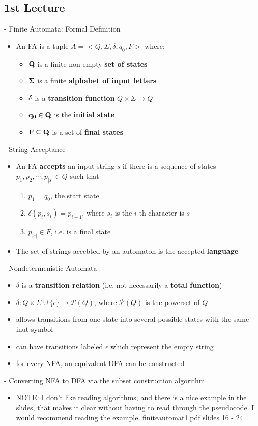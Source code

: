 \documentclass[11pt]{article}
\begin{document}
\subsection{ 1st Lecture }

- Finite Automata: Formal Definition
\begin{itemize}
 \item An FA is a tuple $A=<Q, \Sigma , \delta , q_0 , F>$ where:
  \begin{itemize}
   \item ${\bf Q}$ is a finite non empty {\bf set of states}
   \item ${\bf \Sigma}$ is a finite {\bf alphabet of input letters}
   \item ${\bf \delta}$ is a {\bf transition function} $Q \times \Sigma \rightarrow Q $
   \item ${\bf q_0 \in Q}$ is the {\bf initial state}
   \item ${\bf F \subseteq Q}$ is a set of {\bf final states}
  \end{itemize}
\end{itemize}
- String Acceptance
\begin{itemize}
 \item An FA {\bf accepts} an input string $s$ if there is a sequence of states $p_1 , p_2 , \dotsi , p_{|s|} \in Q$ such that
  \begin{enumerate}
   \item $p_1 = q_0$, the start state
   \item $\delta(p_i , s_i ) = p_{i+1}$, where $s_i$ is the $i$-th character is $s$
   \item $p_{|s|} \in F$, i.e. is a final state
  \end{enumerate}
 \item The set of strings accebted by an automaton is the accepted {\bf language}
\end{itemize}
- Nondetermenistic Automata
\begin{itemize}
 \item $\delta$ is a {\bf transition relation} (i.e. not necessarily a {\bf total function})
 \item $\delta : Q \times \Sigma \cup \{ \epsilon \} \rightarrow \mathcal{P}(Q)$, where $\mathcal{P}(Q)$ is the powerset of $Q$
 \item allows transitions from one state into several possible states with the same inut symbol
 \item can have transitions labeled $\epsilon$ which represent the empty string
 \item for every NFA, an equivalent DFA can be constructed
\end{itemize}
- Converting NFA to DFA via the subset construction algorithm
\begin{itemize}
 \item NOTE: I don't like reading algorithms, and there is a nice example in the slides, that makes it clear without having to read through the pseudocode. I would recommend reading the example. finiteautomat1.pdf slides 16 - 24
\end{itemize}
\end{document}
